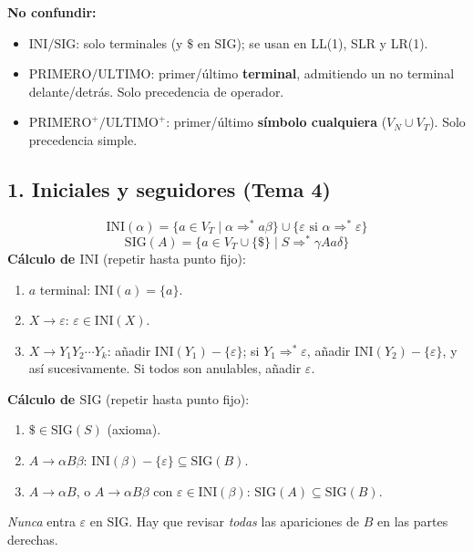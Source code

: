 \begin{landscape}
\begin{multicols*}{3}
\smallskip
\textbf{No confundir:}
\begin{itemize}
\item $\mathrm{INI}/\mathrm{SIG}$: solo terminales (y $\$$ en $\mathrm{SIG}$); se usan en LL(1), SLR y LR(1).
\item $\mathrm{PRIMERO}/\mathrm{ULTIMO}$: primer/último \textbf{terminal}, admitiendo un no terminal delante/detrás. Solo precedencia de operador.
\item $\mathrm{PRIMERO}^+/\mathrm{ULTIMO}^+$: primer/último \textbf{símbolo cualquiera} ($V_N\cup V_T$). Solo precedencia simple.
\end{itemize}

\subsection*{1. Iniciales y seguidores (Tema 4)}
\[
\mathrm{INI}(\alpha)=\{a\in V_T\mid\alpha\Rightarrow^*a\beta\}\cup\{\varepsilon\text{ si }\alpha\Rightarrow^*\varepsilon\}
\]
\[
\mathrm{SIG}(A)=\{a\in V_T\cup\{\$\}\mid S\Rightarrow^*\gamma Aa\delta\}
\]
\textbf{Cálculo de $\mathrm{INI}$} (repetir hasta punto fijo):
\begin{enumerate}
\item $a$ terminal: $\mathrm{INI}(a)=\{a\}$.
\item $X\to\varepsilon$: $\varepsilon\in\mathrm{INI}(X)$.
\item $X\to Y_1Y_2\cdots Y_k$: añadir $\mathrm{INI}(Y_1)-\{\varepsilon\}$; si $Y_1\Rightarrow^*\varepsilon$, añadir $\mathrm{INI}(Y_2)-\{\varepsilon\}$, y así sucesivamente. Si todos son anulables, añadir $\varepsilon$.
\end{enumerate}
\textbf{Cálculo de $\mathrm{SIG}$} (repetir hasta punto fijo):
\begin{enumerate}
\item $\$\in\mathrm{SIG}(S)$ (axioma).
\item $A\to\alpha B\beta$: $\mathrm{INI}(\beta)-\{\varepsilon\}\subseteq\mathrm{SIG}(B)$.
\item $A\to\alpha B$, o $A\to\alpha B\beta$ con $\varepsilon\in\mathrm{INI}(\beta)$: $\mathrm{SIG}(A)\subseteq\mathrm{SIG}(B)$.
\end{enumerate}
\emph{Nunca} entra $\varepsilon$ en $\mathrm{SIG}$. Hay que revisar \emph{todas} las apariciones de $B$ en las partes derechas.

\columnbreak


\end{multicols*}
\end{landscape}
